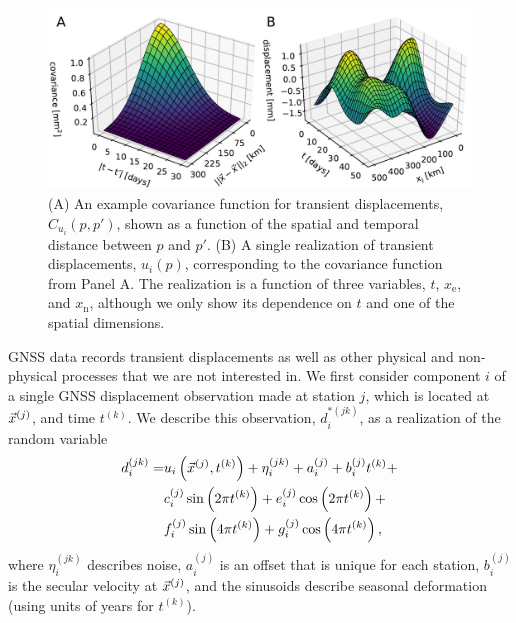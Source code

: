 \documentclass[extra,mreferee]{gji}
\begin{document}
\begin{figure}
\includegraphics{figures/prior_demo/prior-demo.pdf}
\caption{ 
(A) An example covariance function for transient displacements,
$C_{u_i}(p,p')$, shown as a function of the spatial and temporal
distance between $p$ and $p'$. (B) A single realization of transient
displacements, $u_i(p)$, corresponding to the covariance function from
Panel A. The realization is a function of three variables, $t$,
$x_\mathrm{e}$, and $x_\mathrm{n}$, although we only show its
dependence on $t$ and one of the spatial dimensions.
}    
\label{fig:PriorDemo}
\end{figure}


GNSS data records transient displacements as well as other physical
and non-physical processes that we are not interested in. We first
consider component $i$ of a single GNSS displacement observation made
at station $j$, which is located at $\vec{x}^{(j)}$, and time $t^{(k)}$.
We describe this observation, $d_i^{*(jk)}$, as a realization of the
random variable
\begin{align}\label{eq:Data}
\begin{split}
d_i^{(jk)} = &u_i\left(\vec{x}^{(j)},t^{(k)}\right) + 
              \eta_i^{(jk)} + 
              a_i^{(j)} + b_i^{(j)}t^{(k)} + \\
             &c_i^{(j)}\sin\left(2 \pi t^{(k)}\right) +  
              e_i^{(j)}\cos\left(2 \pi t^{(k)}\right) + \\ 
             &f_i^{(j)}\sin\left(4 \pi t^{(k)}\right)  + 
              g_i^{(j)}\cos\left(4 \pi t^{(k)}\right), 
\end{split}
\end{align}
where $\eta_i^{(jk)}$ describes noise, $a_i^{(j)}$ is an offset that
is unique for each station, $b_i^{(j)}$ is the secular velocity at
$\vec{x}^{(j)}$, and the sinusoids describe seasonal deformation (using
units of years for $t^{(k)}$). 
\end{document}
